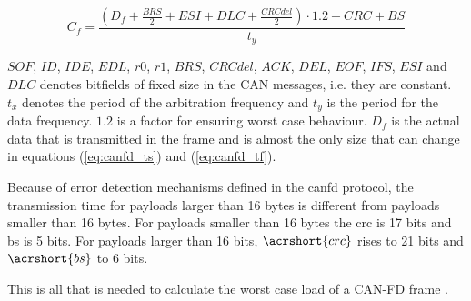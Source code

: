 \begin{equation}
    C_f=\frac{(D_f+\frac{BRS}{2}+ESI+DLC+\frac{CRCdel}{2})\cdot1.2+CRC+BS}{t_y}
    \label{eq:canfd_tf}
\end{equation}

$SOF$, $ID$, $IDE$, $EDL$, $r0$, $r1$, $BRS$, $CRCdel$, $ACK$, $DEL$, $EOF$, $IFS$, $ESI$ and $DLC$ denotes bitfields of fixed size in the CAN messages, i.e. they are constant. $t_x$ denotes the period of the arbitration frequency and $t_y$ is the period for the data frequency. $1.2$ is a factor for ensuring worst case behaviour. $D_f$ is the actual data that is transmitted in the frame and is almost the only size that can change in equations (\ref{eq:canfd_ts}) and (\ref{eq:canfd_tf}).

Because of error detection mechanisms defined in the \acrshort{canfd} protocol, the transmission time for payloads larger than 16 bytes is different from payloads smaller than 16 bytes. For payloads smaller than 16 bytes the \acrfull{crc} is 17 bits and \acrfull{bs} is 5 bits. For payloads larger than 16 bits, $\acrshort{crc}$ rises to 21 bits and $\acrshort{bs}$ to 6 bits.

This is all that is needed to calculate the worst case load of a CAN-FD frame \cite{canfd}.










